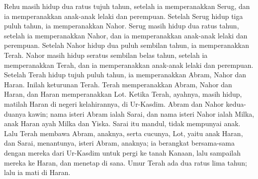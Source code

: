 \begin{biblechapter}
\verse Rehu masih hidup dua ratus tujuh tahun, setelah ia memperanakkan Serug, dan ia memperanakkan anak-anak lelaki dan perempuan.
\verse Setelah Serug hidup tiga puluh tahun, ia memperanakkan Nahor.
\verse Serug masih hidup dua ratus tahun, setelah ia memperanakkan Nahor, dan ia memperanakkan anak-anak lelaki dan perempuan.
\verse Setelah Nahor hidup dua puluh sembilan tahun, ia memperanakkan Terah.
\verse Nahor masih hidup seratus sembilan belas tahun, setelah ia memperanakkan Terah, dan ia memperanakkan anak-anak lelaki dan perempuan.
\verse Setelah Terah hidup tujuh puluh tahun, ia memperanakkan Abram, Nahor dan Haran.
 Inilah keturunan Terah. Terah memperanakkan Abram, Nahor dan Haran, dan Haran memperanakkan Lot.
\verse Ketika Terah, ayahnya, masih hidup, matilah Haran di negeri kelahirannya, di Ur-Kasdim.
\verse Abram dan Nahor kedua-duanya kawin; nama isteri Abram ialah Sarai, dan nama isteri Nahor ialah Milka, anak Haran ayah Milka dan Yiska.
\verse Sarai itu mandul, tidak mempunyai anak.
\verse Lalu Terah membawa Abram, anaknya, serta cucunya, Lot, yaitu anak Haran, dan Sarai, menantunya, isteri Abram, anaknya; ia berangkat bersama-sama dengan mereka dari Ur-Kasdim untuk pergi ke tanah Kanaan, lalu sampailah mereka ke Haran, dan menetap di sana.
\verse Umur Terah ada dua ratus lima tahun; lalu ia mati di Haran.
\end{biblechapter}

